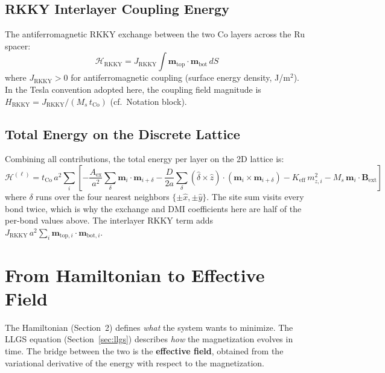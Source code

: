 \documentclass[11pt,a4paper]{article}
\newcommand{\mb}[1]{\mathbf{#1}}
\newcommand{\zhat}{\hat{z}}
\newcommand{\tCo}{t_{\text{Co}}}
\newcommand{\Keff}{K_{\text{eff}}}
\newcommand{\Aex}{A_{\text{ex}}}
\newcommand{\Ms}{M_s}
\begin{document}
\subsection{RKKY Interlayer Coupling Energy}

The antiferromagnetic RKKY exchange between the two Co layers across
the Ru spacer:
%
\begin{equation}
\mathcal{H}_{\text{RKKY}} = J_{\text{RKKY}} \int
    \mb{m}_{\text{top}} \cdot \mb{m}_{\text{bot}} \, dS
\end{equation}
%
where $J_{\text{RKKY}} > 0$ for antiferromagnetic coupling (surface
energy density, J/m$^2$). In the Tesla convention adopted here, the
coupling field magnitude is
$H_{\text{RKKY}} = J_{\text{RKKY}} / (\Ms \, \tCo)$ (cf.\ Notation
block).

\subsection{Total Energy on the Discrete Lattice}

Combining all contributions, the total energy per layer on the 2D
lattice is:
%
\begin{equation}
\mathcal{H}^{(\ell)} = \tCo \, a^2 \sum_i \left[
    -\frac{\Aex}{a^2} \sum_{\delta}
        \mb{m}_i \cdot \mb{m}_{i+\delta}
    - \frac{D}{2a} \sum_{\delta}
        (\hat{\delta} \times \zhat) \cdot
        (\mb{m}_i \times \mb{m}_{i+\delta})
    - \Keff \, m_{z,i}^2
    - \Ms \, \mb{m}_i \cdot \mb{B}_{\text{ext}}
\right]
\end{equation}
%
where $\delta$ runs over the four nearest neighbors
$\{\pm\hat{x}, \pm\hat{y}\}$.  The site sum visits every bond
twice, which is why the exchange and DMI coefficients here are half
of the per-bond values above.  The interlayer RKKY term adds
$J_{\text{RKKY}} \, a^2 \sum_i
    \mb{m}_{\text{top},i} \cdot \mb{m}_{\text{bot},i}$.

\section{From Hamiltonian to Effective Field}
\label{sec:variational}

The Hamiltonian (Section~2) defines \emph{what} the system wants to
minimize.  The LLGS equation (Section~\ref{sec:llgs}) describes \emph{how} the
magnetization evolves in time.  The bridge between the two is the
\textbf{effective field}, obtained from the variational derivative of
the energy with respect to the magnetization.
\end{document}
